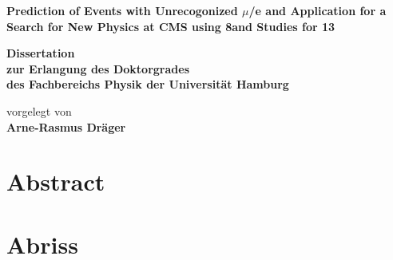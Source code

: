 \documentclass[
twoside=false,
headsepline,     %
headings=normal,
open=any,
numbers=noenddot, %
numbering %
]{scrreprt} %
\author{Arne-Rasmus Dr\"ager}
\begin{document}
\begin{titlepage}
  \begin{center}
    \thispagestyle{empty}
    \vspace*{1cm}
    \begin{doublespace} 
      \textbf{\huge
        Prediction of \wdecay Events with Unrecogonized $\mu$/e and Application for a Search for New Physics at CMS using 8\tev and Studies for 13\tev}
      \vskip1.5cm
      \begin{Large} 
        \textbf{Dissertation\\
        zur Erlangung des Doktorgrades\\
        des Fachbereichs Physik
        der Universit\"{a}t Hamburg\\}
      \end{Large}
      \vskip2cm
      \begin{large}
        vorgelegt von\\
        {\bf Arne-Rasmus Dr\"{a}ger}
        \vfill
      \end{large}
    \end{doublespace} 
  \end{center}
\end{titlepage}

\newpage
\thispagestyle{empty}

\quad
\vfill
{}

\newpage
\thispagestyle{empty}
\section*{Abstract}

\clearpage
\section*{Abriss}

\newpage 
\thispagestyle{empty}
\quad 
\newpage
\end{document}
